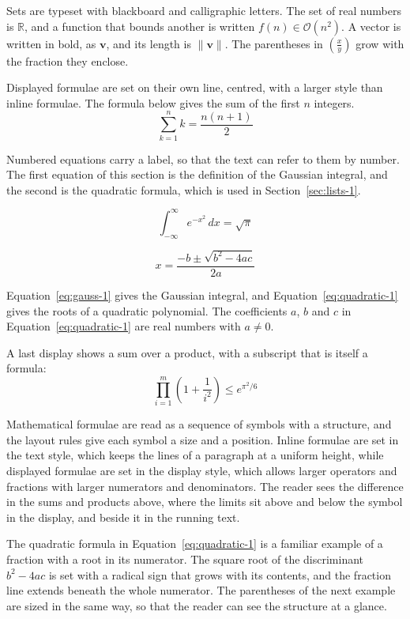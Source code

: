 \documentclass{article}
\begin{document}
Sets are typeset with blackboard and calligraphic letters. The set of real numbers is
$\mathbb{R}$, and a function that bounds another is written $f(n) \in \mathcal{O}(n^2)$.
A vector is written in bold, as $\mathbf{v}$, and its length is $\|\mathbf{v}\|$. The
parentheses in $\left( \frac{x}{y} \right)$ grow with the fraction they enclose.

Displayed formulae are set on their own line, centred, with a larger style than inline
formulae. The formula below gives the sum of the first $n$ integers.
\[
  \sum_{k=1}^{n} k = \frac{n(n+1)}{2}
\]

Numbered equations carry a label, so that the text can refer to them by number. The
first equation of this section is the definition of the Gaussian integral, and the
second is the quadratic formula, which is used in Section~\ref{sec:lists-1}.

\begin{equation}\label{eq:gauss-1}
  \int_{-\infty}^{\infty} e^{-x^{2}}\,dx = \sqrt{\pi}
\end{equation}

\begin{equation}\label{eq:quadratic-1}
  x = \frac{-b \pm \sqrt{b^{2}-4ac}}{2a}
\end{equation}

Equation~\ref{eq:gauss-1} gives the Gaussian integral, and
Equation~\ref{eq:quadratic-1} gives the roots of a quadratic polynomial. The coefficients
$a$, $b$ and $c$ in Equation~\ref{eq:quadratic-1} are real numbers with $a \neq 0$.

A last display shows a sum over a product, with a subscript that is itself a formula:
\[
  \prod_{i=1}^{m} \left( 1 + \frac{1}{i^{2}} \right) \leq e^{\pi^{2}/6}
\]

Mathematical formulae are read as a sequence of symbols with a structure, and the layout
rules give each symbol a size and a position. Inline formulae are set in the text style,
which keeps the lines of a paragraph at a uniform height, while displayed formulae are
set in the display style, which allows larger operators and fractions with larger
numerators and denominators. The reader sees the difference in the sums and products
above, where the limits sit above and below the symbol in the display, and beside it in
the running text.

The quadratic formula in Equation~\ref{eq:quadratic-1} is a familiar example of a
fraction with a root in its numerator. The square root of the discriminant
$b^{2}-4ac$ is set with a radical sign that grows with its contents, and the
fraction line extends beneath the whole numerator. The parentheses of the next example
are sized in the same way, so that the reader can see the structure at a glance.
\end{document}
